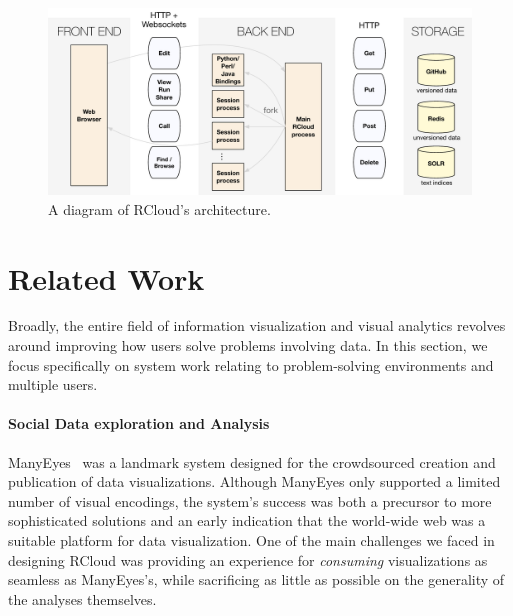 \begin{figure}
\centering
\includegraphics[width=.75\linewidth]{fig/system/system.pdf}
\caption{\label{fig:system}A diagram of RCloud's architecture. }
\end{figure}

\section{Related Work\label{sec:related}}

Broadly, the entire field of information visualization and visual analytics
revolves around improving how users solve problems involving data.
In this section, we focus specifically on
system work relating to problem-solving environments and multiple users.

\paragraph*{Social Data exploration and Analysis}
ManyEyes~\cite{Viegas:2007:MAS} was a landmark system designed
for the crowdsourced creation and publication of data
visualizations. Although ManyEyes only supported a limited number of
visual encodings, the system's success was both a precursor to more
sophisticated solutions and an early indication that the world-wide
web was a suitable platform for data visualization. One of the main
challenges we faced in designing RCloud was providing an experience
for \emph{consuming} visualizations as seamless as ManyEyes's, while
sacrificing as little as possible on the generality of the analyses
themselves.

